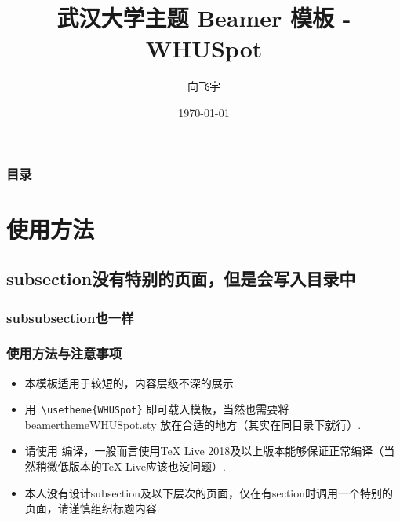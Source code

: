 \documentclass{beamer}
\title{武汉大学主题 Beamer 模板 - WHUSpot}
\author{向飞宇}
\institute{武汉大学}
\date{\today}
\begin{document}
\begin{frame}
    \titlepage
\end{frame}

\begin{frame}
    \frametitle{目录}
    \tableofcontents
\end{frame}

\section{使用方法}

\subsection{subsection没有特别的页面，但是会写入目录中}

\subsubsection{subsubsection也一样}

\begin{frame}[fragile]
    \frametitle{使用方法与注意事项}
    \begin{itemize}
        \item 本模板适用于\alert{较短的，内容层级不深的}展示.
        \item 用~\verb|\usetheme{WHUSpot}| 即可载入模板，当然也需要将 beamerthemeWHUSpot.sty 放在合适的地方（其实在同目录下就行）.
        \item 请使用  编译，一般而言使用\alert{TeX Live 2018}及以上版本能够保证正常编译（当然稍微低版本的TeX Live应该也没问题）.
        \item 本人\alert{没有设计subsection及以下层次}的页面，仅在有section时调用一个特别的页面，请谨慎组织标题内容.
    \end{itemize}
\end{frame}
\end{document}
